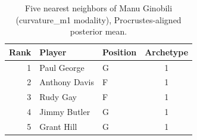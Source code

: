 \begin{table}[htbp]
  \centering\small
  \begin{tabular}{rllc}
    \toprule
    Rank & Player & Position & Archetype \\
    \midrule
    1 & Paul George & G & 1 \\
    2 & Anthony Davis & F & 1 \\
    3 & Rudy Gay & F & 1 \\
    4 & Jimmy Butler & G & 1 \\
    5 & Grant Hill & G & 1 \\
    \bottomrule
  \end{tabular}
  \caption{Five nearest neighbors of Manu Ginobili (curvature_m1 modality), Procrustes-aligned posterior mean.}
  \label{tab:Manu_Ginobili_neighbors_curvature_m1}
\end{table}

